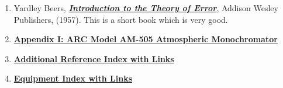 \documentclass{../lab}
\begin{document}
\begin{enumerate}
    \item Yardley Beers, \emph{\href{https://drive.google.com/file/d/1XSiIAxutmS_kMcnMy5YxO7Ah0chjGtCp/view?usp=drive_link}{\textbf{Introduction to the Theory of Error}}}, Addison Wesley Publishers, (1957). This is a short book which is very good.
    
    \item
    \href{https://berkeley-physics111b.github.io/appendices/ATMAppendix1/}{\textbf{Appendix I: ARC Model AM-505 Atmospheric Monochromator}}

    \item
    \href{https://drive.google.com/file/d/1nFMhrUp6M223EXBNZx-VVMmRQJDwkZeJ/view?usp=drive_link}{\textbf{Additional Reference Index with Links}}

    \item \href{https://drive.google.com/file/d/1nzRzL8c1PURQs2PAo13HrSBpFJSsiVIh/view?usp=drive_link}{\textbf{Equipment Index with Links}}
    
\end{enumerate}

\end{document}
